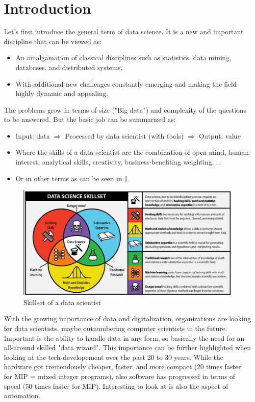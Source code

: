\section*{Introduction}
\setcounter{figure}{0}

Let's first introduce the general term of data science. It is a new and important discipline that can be viewed as:
\begin{itemize}
  \item An amalgamation of classical disciplines such as statistics, data mining, databases, and distributed systems,
  \item With additional new challenges constantly emerging and making the field highly dynamic and appealing.
\end{itemize} 
The problems grow in terms of size ("Big data") and complexity of the questions to be answered. But the basic job can be summarized as:
\begin{itemize}
  \item Input: data $\Rightarrow$ Processed by data scientist (with tools) $\Rightarrow$ Output: value
  \item Where the skills of a data scientist are the combination of open mind, human interest, analytical skills, creativity, business-benefiting weighting, $\dots$
  \item Or in other terms as can be seen in \ref{fig:0_skillset}
\end{itemize}

\begin{figure}[H]
  \centering
  \includegraphics[width=\textwidth]{assets/intro/data_scientist_skillset.png} 
  \caption{Skillset of a data scientist}
  \label{fig:0_skillset}
\end{figure}

With the growing importance of data and digitalization, organizations are looking for data scientists, maybe outnumbering computer scientists in the future. Important is the ability to handle data in any form, so basically the need for an all-around skilled "data wizard". This importance can be further highlighted when looking at the tech-developement over the past 20 to 30 years. While the hardware got tremendously cheaper, faster, and more compact (20 times faster for MIP = mixed integer programs), also software has progressed in terms of speed (50 times faster for MIP). Interesting to look at is also the aspect of automation.


